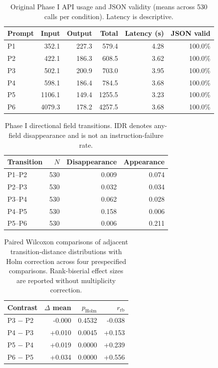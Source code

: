 \begin{table}[t]
\centering
\small
\caption{Original Phase I API usage and JSON validity (means across 530 calls per condition). Latency is descriptive.}
\label{tab:phase1-usage}
\begin{tabular}{lrrrrr}
\toprule
Prompt & Input & Output & Total & Latency (s) & JSON valid \\
\midrule
P1 & 352.1 & 227.3 & 579.4 & 4.28 & 100.0\% \\
P2 & 422.1 & 186.3 & 608.5 & 3.62 & 100.0\% \\
P3 & 502.1 & 200.9 & 703.0 & 3.95 & 100.0\% \\
P4 & 598.1 & 186.4 & 784.5 & 3.68 & 100.0\% \\
P5 & 1106.1 & 149.4 & 1255.5 & 3.23 & 100.0\% \\
P6 & 4079.3 & 178.2 & 4257.5 & 3.68 & 100.0\% \\
\bottomrule
\end{tabular}
\end{table}

\begin{table}[t]
\centering
\small
\caption{Phase I directional field transitions. IDR denotes any-field disappearance and is not an instruction-failure rate.}
\label{tab:phase1-idr}
\begin{tabular}{lrrr}
\toprule
Transition & $N$ & Disappearance & Appearance \\
\midrule
P1--P2 & 530 & 0.009 & 0.074 \\
P2--P3 & 530 & 0.032 & 0.034 \\
P3--P4 & 530 & 0.062 & 0.028 \\
P4--P5 & 530 & 0.158 & 0.006 \\
P5--P6 & 530 & 0.006 & 0.211 \\
\bottomrule
\end{tabular}
\end{table}

\begin{table}[t]
\centering
\small
\caption{Paired Wilcoxon comparisons of adjacent transition-distance distributions with Holm correction across four prespecified comparisons. Rank-biserial effect sizes are reported without multiplicity correction.}
\label{tab:phase1-paired}
\begin{tabular}{lrrr}
\toprule
Contrast & $\Delta$ mean & $p_{\mathrm{Holm}}$ & $r_{\mathrm{rb}}$ \\
\midrule
P3 $-$ P2 & -0.000 & 0.4532 & -0.038 \\
P4 $-$ P3 & +0.010 & 0.0045 & +0.153 \\
P5 $-$ P4 & +0.019 & 0.0000 & +0.239 \\
P6 $-$ P5 & +0.034 & 0.0000 & +0.556 \\
\bottomrule
\end{tabular}
\end{table}

